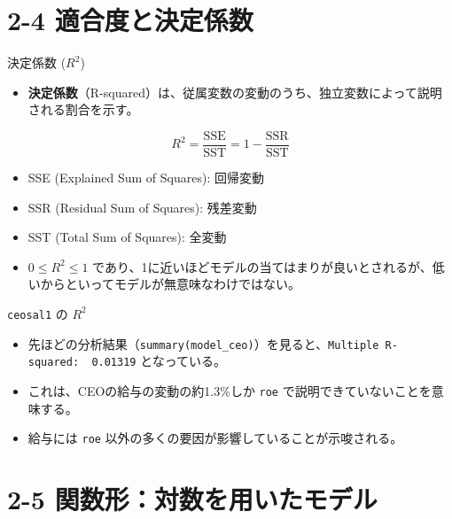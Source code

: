 \documentclass[
  ignorenonframetext,
]{beamer}
\providecommand{\tightlist}{%
  \setlength{\itemsep}{0pt}\setlength{\parskip}{0pt}}
\begin{document}
\hypertarget{ux9069ux5408ux5ea6ux3068ux6c7aux5b9aux4fc2ux6570}{%
\section{2-4
適合度と決定係数}\label{ux9069ux5408ux5ea6ux3068ux6c7aux5b9aux4fc2ux6570}}

\begin{frame}{決定係数 (\(R^2\))}
\protect\hypertarget{ux6c7aux5b9aux4fc2ux6570-r2}{}
\begin{itemize}
\tightlist
\item
  \textbf{決定係数}（R-squared）は、従属変数の変動のうち、独立変数によって説明される割合を示す。
\end{itemize}

\[ R^2 = \frac{\text{SSE}}{\text{SST}} = 1 - \frac{\text{SSR}}{\text{SST}} \]

\begin{itemize}
\item
  SSE (Explained Sum of Squares): 回帰変動
\item
  SSR (Residual Sum of Squares): 残差変動
\item
  SST (Total Sum of Squares): 全変動
\item
  \(0 \le R^2 \le 1\)
  であり、1に近いほどモデルの当てはまりが良いとされるが、低いからといってモデルが無意味なわけではない。
\end{itemize}
\end{frame}

\begin{frame}[fragile]{\texttt{ceosal1} の \(R^2\)}
\protect\hypertarget{ceosal1-ux306e-r2}{}
\begin{itemize}
\tightlist
\item
  先ほどの分析結果（\texttt{summary(model\_ceo)}）を見ると、\texttt{Multiple\ R-squared:\ \ 0.01319}
  となっている。
\item
  これは、CEOの給与の変動の約1.3\%しか \texttt{roe}
  で説明できていないことを意味する。
\item
  給与には \texttt{roe} 以外の多くの要因が影響していることが示唆される。
\end{itemize}
\end{frame}

\hypertarget{ux95a2ux6570ux5f62ux5bfeux6570ux3092ux7528ux3044ux305fux30e2ux30c7ux30eb}{%
\section{2-5
関数形：対数を用いたモデル}\label{ux95a2ux6570ux5f62ux5bfeux6570ux3092ux7528ux3044ux305fux30e2ux30c7ux30eb}}
\end{document}

